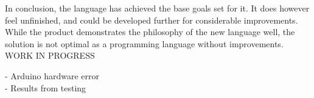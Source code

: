 In conclusion, the language has achieved the base goals set for it. It does however feel unfinished, and could be developed further for considerable improvements. While the product demonstrates the philosophy of the new language well, the solution is not optimal as a programming language without improvements.\\

WORK IN PROGRESS

 - Arduino hardware error \\
 - Results from testing \\